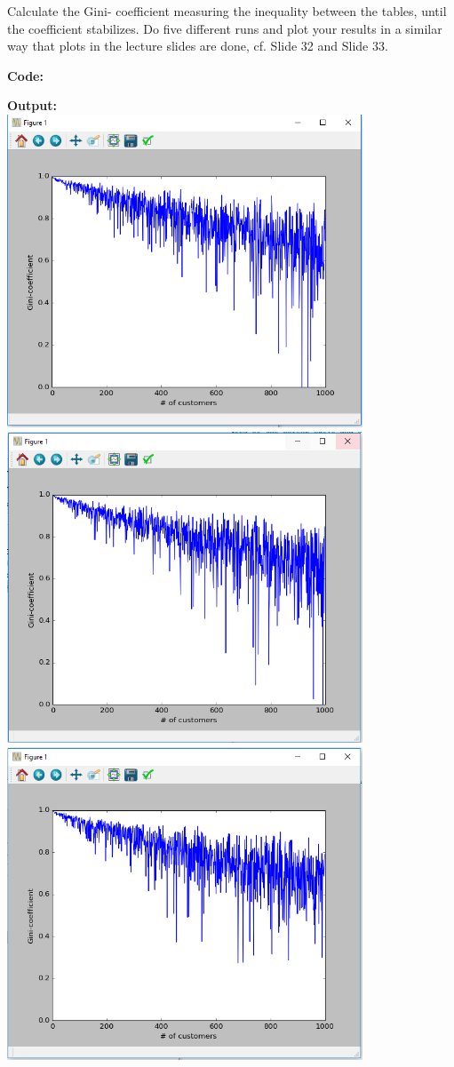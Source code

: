 \documentclass{WeSTassignment}
\begin{document}
Calculate the Gini-
coefficient measuring the inequality between the tables,
until the coefficient stabilizes. Do five different runs and plot your results in a similar way that plots in the lecture slides are done, cf. Slide 32 and Slide 33.

\textbf{Code:}

\textbf{Output:}\\
\includegraphics[width=400px]{1stPlot}\\
\includegraphics[width=400px]{2ndPlot}\\
\includegraphics[width=400px]{3rdPlot}\\
\end{document}
